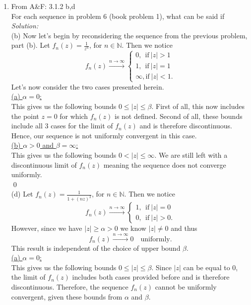 \documentclass[10pt]{amsart}
\theoremstyle{nonumberplain}
\begin{document}
\begin{enumerate}[label={\bf {\arabic*}:}]
\item From A\&F: 3.1.2 b,d \\
For each sequence in problem 6 (book problem 1), what can be said if \\
\textit{Solution:} \\
(b) Now let's begin by reconsidering the sequence from the previous problem, part (b).
Let $f_n(z) = \frac 1 {z^n}$, for $n \in \mathbb N$. Then we notice
$$
f_n(z) \overset{n \to \infty}{\longrightarrow} \begin{cases}
0, \: \: \text{if}\: |z| > 1 \\
1, \: \: \text{if}\: |z| = 1 \\
\infty, \text{if}\: |z| < 1.
\end{cases}
$$
Let's now consider the two cases presented herein. \\

\underline{(a) $\alpha = 0$:} \\
This gives us the following bounds $0 \leq |z| \leq \beta$.
First of all, this now includes the point $z = 0$ for which $f_n(z)$ is not defined.
Second of all, these bounds include all 3 cases for the limit of $f_n(z)$ and is therefore discontinuous.
Hence, our sequence is not uniformly convergent in this case. \\

\underline{(b) $\alpha > 0$ and $\beta = \infty$:} \\
This gives us the following bounds $0 < |z| \leq \infty$.
We are still left with a discontinuous limit of $f_n(z)$ meaning the sequence does not converge uniformly. \\
\qed \\

\noindent
(d) Let $f_n(z) = \frac 1 {1 + (nz)^2}$, for $n \in \mathbb N$. Then we notice
$$
f_n(z) \overset{n \to \infty}{\longrightarrow} \begin{cases}
1, \: \: \text{if}\: |z| = 0 \\
0, \: \: \text{if}\: |z| > 0.
\end{cases}
$$
However, since we have $|z| \geq \alpha > 0$ we know $|z| \neq 0$ and thus
$$
f_n(z) \overset{n \to \infty}{\longrightarrow} 0 \quad \text{uniformly}.
$$
This result is independent of the choice of upper bound $\beta$. \\

\underline{(a) $\alpha = 0$:} \\
This gives us the following bounds $0 \leq |z| \leq \beta$.
Since $|z|$ can be equal to $0$, the limit of $f_n(z)$ includes both cases provided before and is therefore discontinuous.
Therefore, the sequence $f_n(z)$ cannot be uniformly convergent, given these bounds from $\alpha$ and $\beta$. \\


\end{enumerate}
\end{document}
